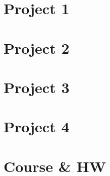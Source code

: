 \section{Project 1}
\section{Project 2}
\section{Project 3}
\section{Project 4}

\section{Course \& HW}